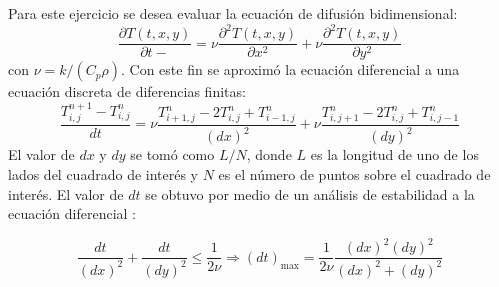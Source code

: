 \documentclass{article}
\begin{document}
Para este ejercicio se desea evaluar la ecuación de difusión bidimensional:
\begin{equation*}
\frac{\partial T(t, x, y)}{\partial t-} = \nu \frac{\partial^2 T(t, x, y)}{\partial x^2} + \nu \frac{\partial^2 T(t, x, y)}{\partial y^2}
\end{equation*}
con $\nu = k/(C_p\rho)$. Con este fin se aproximó la ecuación diferencial a una ecuación discreta de diferencias finitas:
\begin{equation*}
\frac{T_{i, j}^{n+1} - T_{i, j}^{n}}{dt} = \nu\frac{T^n_{i+1, j} -2T^n_{i, j}+T^n_{i-1, j}}{(dx)^2} + \nu\frac{T^n_{i, j+1} -2T^n_{i, j}+T^n_{i, j-1}}{(dy)^2}
\end{equation*}
El valor de $dx$ y $dy$ se tomó como $L/N$, donde $L$ es la longitud de uno de los lados del cuadrado de interés y $N$ es el número de puntos sobre el cuadrado de interés. El valor de $dt$ se obtuvo por medio de un análisis de estabilidad a la ecuación diferencial \cite{mit}:

\begin{equation*}
    \frac{dt}{(dx)^2} + \frac{dt}{(dy)^2} \leq \frac{1}{2\nu} \Rightarrow (dt)_{\text{max}} = \frac{1}{2\nu}\frac{(dx)^2(dy)^2}{(dx)^2+(dy)^2}
\end{equation*}
\end{document}

